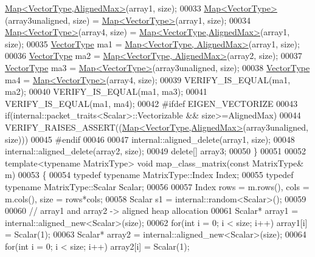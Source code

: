 \begin{DoxyCode}
      \hyperlink{group___core___module_class_eigen_1_1_map}{Map<VectorType,AlignedMax>}(array1, size);
00033   \hyperlink{group___core___module_class_eigen_1_1_map}{Map<VectorType>}(array3unaligned, size) = \hyperlink{group___core___module_class_eigen_1_1_map}{Map<VectorType>}(array1, size);
00034   \hyperlink{group___core___module_class_eigen_1_1_map}{Map<VectorType>}(array4, size)          = 
      \hyperlink{group___core___module_class_eigen_1_1_map}{Map<VectorType,AlignedMax>}(array1, size);
00035   \hyperlink{struct_vector_type}{VectorType} ma1 = \hyperlink{group___core___module_class_eigen_1_1_map}{Map<VectorType, AlignedMax>}(array1, size);
00036   \hyperlink{struct_vector_type}{VectorType} ma2 = \hyperlink{group___core___module_class_eigen_1_1_map}{Map<VectorType, AlignedMax>}(array2, size);
00037   \hyperlink{struct_vector_type}{VectorType} ma3 = \hyperlink{group___core___module_class_eigen_1_1_map}{Map<VectorType>}(array3unaligned, size);
00038   \hyperlink{struct_vector_type}{VectorType} ma4 = \hyperlink{group___core___module_class_eigen_1_1_map}{Map<VectorType>}(array4, size);
00039   VERIFY\_IS\_EQUAL(ma1, ma2);
00040   VERIFY\_IS\_EQUAL(ma1, ma3);
00041   VERIFY\_IS\_EQUAL(ma1, ma4);
00042 \textcolor{preprocessor}{  #ifdef EIGEN\_VECTORIZE}
00043   \textcolor{keywordflow}{if}(internal::packet\_traits<Scalar>::Vectorizable && size>=AlignedMax)
00044     VERIFY\_RAISES\_ASSERT((\hyperlink{group___core___module_class_eigen_1_1_map}{Map<VectorType,AlignedMax>}(array3unaligned, size)))
00045   \textcolor{preprocessor}{#endif}
00046 
00047   internal::aligned\_delete(array1, size);
00048   internal::aligned\_delete(array2, size);
00049   \textcolor{keyword}{delete}[] array3;
00050 \}
00051 
00052 \textcolor{keyword}{template}<\textcolor{keyword}{typename} MatrixType> \textcolor{keywordtype}{void} map\_class\_matrix(\textcolor{keyword}{const} MatrixType& m)
00053 \{
00054   \textcolor{keyword}{typedef} \textcolor{keyword}{typename} MatrixType::Index Index;
00055   \textcolor{keyword}{typedef} \textcolor{keyword}{typename} MatrixType::Scalar Scalar;
00056 
00057   Index rows = m.rows(), cols = m.cols(), size = rows*cols;
00058   Scalar s1 = internal::random<Scalar>();
00059 
00060   \textcolor{comment}{// array1 and array2 -> aligned heap allocation}
00061   Scalar* array1 = internal::aligned\_new<Scalar>(size);
00062   \textcolor{keywordflow}{for}(\textcolor{keywordtype}{int} i = 0; i < size; i++) array1[i] = Scalar(1);
00063   Scalar* array2 = internal::aligned\_new<Scalar>(size);
00064   \textcolor{keywordflow}{for}(\textcolor{keywordtype}{int} i = 0; i < size; i++) array2[i] = Scalar(1);

\end{DoxyCode}
